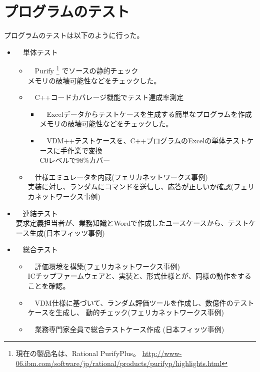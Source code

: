 \section{プログラムのテスト}
	\label{TestOfProgram}

	プログラムのテストは以下のように行った。

	\begin{itemize}
	\item　単体テスト
		\begin{itemize}
		\item　Purify
				\footnote{現在の製品名は、Rational PurifyPlus。
					\url{http://www-06.ibm.com/software/jp/rational/products/purifyp/highlights.html}}
				でソースの静的チェック \\
				メモリの破壊可能性などをチェックした。
		\item　C++コードカバレージ機能でテスト達成率測定
			\begin{itemize}
			\item　Excelデータからテストケースを生成する簡単なプログラムを作成 \\
				メモリの破壊可能性などをチェックした。
			\item　VDM++テストケースを、C++プログラムのExcelの単体テストケースに手作業で変換 \\
				C0レベルで98\%カバー
			\end{itemize} 
		\item　仕様エミュレータを内蔵(フェリカネットワークス事例) \\
				実装に対し、ランダムにコマンドを送信し、応答が正しいか確認(フェリカネットワークス事例)
		\end{itemize} 
	\item　連結テスト \\
		要求定義担当者が、業務知識とWordで作成したユースケースから、テストケース生成(日本フィッツ事例)
	\item　総合テスト
		\begin{itemize}
		\item　評価環境を構築(フェリカネットワークス事例) \\
			ICチップファームウェアと、実装と、形式仕様とが、同様の動作をすることを確認。
		\item　VDM仕様に基づいて、ランダム評価ツールを作成し、数億件のテストケースを生成し、
			動的チェック(フェリカネットワークス事例)
		\item　業務専門家全員で総合テストケース作成 (日本フィッツ事例)
		\end{itemize} 
	\end{itemize} 

